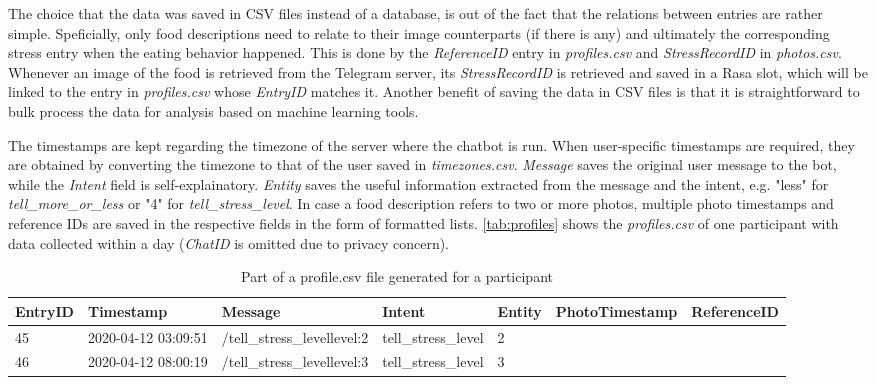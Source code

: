 The choice that the data was saved in CSV files instead of a database, is out of the fact that the relations between entries are rather simple. Speficially, only food descriptions need to relate to their image counterparts (if there is any) and ultimately the corresponding stress entry when the eating behavior happened. This is done by the \emph{ReferenceID} entry in \emph{profiles.csv} and \emph{StressRecordID} in \emph{photos.csv}. Whenever an image of the food is retrieved from the Telegram server, its \emph{StressRecordID} is retrieved and saved in a Rasa slot, which will be linked to the entry in \emph{profiles.csv} whose \emph{EntryID} matches it. Another benefit of saving the data in CSV files is that it is straightforward to bulk process the data for analysis based on machine learning tools.

The timestamps are kept regarding the timezone of the server where the chatbot is run. When user-specific timestamps are required, they are obtained by converting the timezone to that of the user saved in \emph{timezones.csv}. \emph{Message} saves the original user message to the bot, while the \emph{Intent} field is self-explainatory. \emph{Entity} saves the useful information extracted from the message and the intent, e.g. "less" for \emph{tell\_more\_or\_less} or "4" for \emph{tell\_stress\_level}. In case a food description refers to two or more photos, multiple photo timestamps and reference IDs are saved in the respective fields in the form of formatted lists. \autoref{tab:profiles} shows the \emph{profiles.csv} of one participant with data collected within a day (\emph{ChatID} is omitted due to privacy concern).

\begin{table}[htpb]
  \caption[Sample User Data]{Part of a profile.csv file generated for a participant}\label{tab:profiles}
  \centering
  \tiny
  \begin{tabular}{l l l l l l l}
    \toprule
      EntryID & Timestamp & Message & Intent & Entity & PhotoTimestamp & ReferenceID \\
    \midrule
      45 & 2020-04-12 03:09:51 & /tell\_stress\_level{level:2} & tell\_stress\_level & 2 & & \\
      46 & 2020-04-12 08:00:19 & /tell\_stress\_level{level:3} & tell\_stress\_level & 3 & & \\
    \bottomrule
  \end{tabular}
\end{table}
